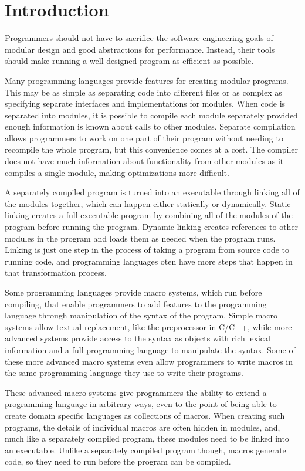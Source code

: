 \chapter{Introduction}
\label{chap:introduction}

Programmers should not have to sacrifice the software engineering goals of modular design and good abstractions for performance. 
Instead, their tools should make running a well-designed program as efficient as possible. 

Many programming languages provide features for creating modular programs. 
This may be as simple as separating code into different files or as complex as specifying separate interfaces and implementations for modules.
When code is separated into modules, it is possible to compile each module separately provided enough information is known about calls to other modules.
Separate compilation allows programmers to work on one part of their program without needing to recompile the whole program, but this convenience comes at a cost.
The compiler does not have much information about functionality from other modules as it compiles a single module, making optimizations more difficult.

A separately compiled program is turned into an executable through linking all of the modules together, which can happen either statically or dynamically.
Static linking creates a full executable program by combining all of the modules of the program before running the program.
Dynamic linking creates references to other modules in the program and loads them as needed when the program runs.
Linking is just one step in the process of taking a program from source code to running code, and programming languages oten have more steps that happen in that transformation process.

Some programming languages provide macro systems, which run before compiling, that enable programmers to add features to the programming language through manipulation of the syntax of the program.
Simple macro systems allow textual replacement, like the preprocessor in C/C++, while more advanced systems provide access to the syntax as objects with rich lexical information and a full programming language to manipulate the syntax.
Some of these more advanced macro systems even allow programmers to write macros in the same programming language they use to write their programs. 

These advanced macro systems give programmers the ability to extend a programming language in arbitrary ways, even to the point of being able to create domain specific languages as collections of macros.
When creating such programs, the details of individual macros are often hidden in modules, and, much like a separately compiled program, these modules need to be linked into an executable. 
Unlike a separately compiled program though, macros generate code, so they need to run before the program can be compiled.


